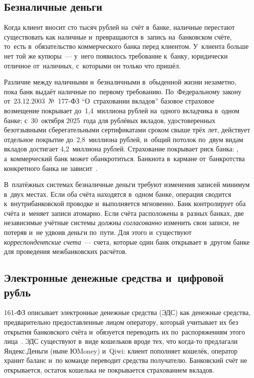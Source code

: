 \subsection*{Безналичные деньги}

Когда клиент вносит сто тысяч рублей на~счёт в~банке, наличные перестают
существовать как наличные и~превращаются в~запись на~банковском счёте, то~есть
в~обязательство коммерческого банка перед клиентом. У~клиента больше нет той же
купюры~--- у~него появилось требование к~банку, юридически отличное
от~наличных, с~которыми он только что пришёл.

Различие между наличными и~безналичными в~обыденной жизни незаметно, пока банк
выдаёт наличные по~первому требованию. По~Федеральному закону
от~23.12.2003~№~177-ФЗ \enquote{О~страховании вкладов} базовое страховое
возмещение покрывает до~1,4~миллиона рублей на~одного вкладчика в~одном банке;
с~30~октября 2025~года для рублёвых вкладов, удостоверенных безотзывными
сберегательными сертификатами сроком свыше трёх лет, действует отдельное
покрытие до~2,8~миллиона рублей, и~общий потолок по~двум видам вкладов
достигает 4,2~миллиона рублей. Страхование покрывает риск банка:
,
а~коммерческий банк может обанкротиться. Банкнота в~кармане от~банкротства
конкретного банка не зависит~\cite{fz-177}.

В~платёжных системах безналичные деньги требуют изменения записей минимум
в~двух местах. Если оба счёта находятся в~одном банке, операция сводится
к~внутрибанковской проводке и~выполняется мгновенно. Банк контролирует оба счёта
и~меняет записи атомарно. Если счёта расположены в~разных банках, две
независимые учётные системы должны \textit{согласованно} изменить свои записи,
не потеряв и~не удвоив деньги по~пути. Для этого и~существуют
\textit{корреспондентские счета}~--- счета, которые один банк открывает
в~другом банке для проведения межбанковских расчётов.

\subsection*{Электронные денежные средства и~цифровой рубль}

161-ФЗ описывает электронные денежные средства (ЭДС) как денежные средства,
предварительно предоставленные лицом оператору, который учитывает их без
открытия банковского счёта и~обязуется переводить их по~распоряжениям этого
лица~\cite{fz-161}. ЭДС существуют в~виде кошельков вроде тех, что когда-то
предлагали Яндекс.Деньги (ныне ЮMoney) и~Qiwi: клиент пополняет кошелёк,
оператор хранит баланс и~по команде переводит средства получателю. Банковский
счёт не открывается, остаток кошелька не покрывается страхованием вкладов.

